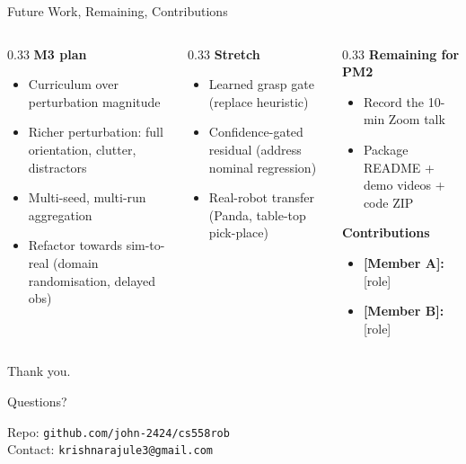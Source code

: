 \documentclass[aspectratio=169, 10pt]{beamer}
\begin{document}
\begin{frame}{Future Work, Remaining, Contributions}
  \small
  \begin{columns}[T]
    \begin{column}{0.33\textwidth}
      \textbf{\textcolor{accent3}{M3 plan}}
      \begin{itemize}
        \item Curriculum over perturbation magnitude
        \item Richer perturbation: full orientation, clutter, distractors
        \item Multi-seed, multi-run aggregation
        \item Refactor towards sim-to-real (domain randomisation, delayed obs)
      \end{itemize}
    \end{column}
    \begin{column}{0.33\textwidth}
      \textbf{\textcolor{accent2}{Stretch}}
      \begin{itemize}
        \item Learned grasp gate (replace heuristic)
        \item Confidence-gated residual (address nominal regression)
        \item Real-robot transfer (Panda, table-top pick-place)
      \end{itemize}
    \end{column}
    \begin{column}{0.33\textwidth}
      \textbf{Remaining for PM2}
      \begin{itemize}
        \item Record the 10-min Zoom talk
        \item Package README + demo videos + code ZIP
      \end{itemize}
      \vspace{0.5em}
      \textbf{Contributions}
      \begin{itemize}
        \item \textbf{[Member A]:} [role]
        \item \textbf{[Member B]:} [role]
      \end{itemize}
    \end{column}
  \end{columns}
\end{frame}

\begin{frame}[standout]
  Thank you.

  \vspace{1em}
  \normalsize
  Questions?

  \vspace{2em}
  \scriptsize
  Repo: \texttt{github.com/john-2424/cs558rob} \\
  Contact: \texttt{krishnarajule3@gmail.com}
\end{frame}
\end{document}

